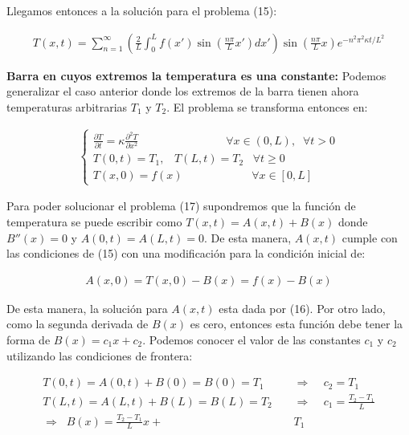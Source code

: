 \documentclass[12pt]{article}
\begin{document}
Llegamos entonces a la solución para el problema (15):

\begin{align}
    T(x,t) = \sum_{n=1}^{\infty} \left(\frac{2}{L}\int_0^L f(x')\sin \left(\frac{n\pi}{L}x'\right)dx'\right)\sin\left(\frac{n\pi}{L}x\right) e^{-n^2\pi^2\kappa t/L^2}
\end{align}

\textbf{Barra en cuyos extremos la temperatura es una constante: } Podemos generalizar el caso anterior donde los extremos de la barra tienen ahora temperaturas arbitrarias $T_1$ y $T_2$. El problema se transforma entonces en:

\begin{align}
    \begin{cases}
        \frac{\partial T}{\partial t} = \kappa \frac{\partial^2 T}{\partial x^2} \;\;\;\;\;\;\;\;\;\;\;\;\;\;\;\;\;\;\;\;\;\;\;\;\;\;\;\; \forall x\in (0,L), \;\; \forall t>0 \\
        T(0,t) = T_1, \;\;\; T(L,t) = T_2 \;\;\; \forall t \geq 0 \\
        T(x,0) = f(x) \;\;\;\;\;\;\;\;\;\;\;\;\;\;\;\;\;\;\;\;\;\; \forall x\in [0,L]
    \end{cases}
\end{align}

Para poder solucionar el problema (17) supondremos que la función de temperatura se puede escribir como $T(x,t) = A(x,t)+B(x)$ donde $B''(x) = 0$ y $A(0,t) = A(L,t) = 0$. De esta manera, $A(x,t)$ cumple con las condiciones de (15) con una modificación para la condición inicial de:

\begin{align*}
    A(x,0) = T(x,0)-B(x) = f(x) - B(x)
\end{align*}

De esta manera, la solución para $A(x,t)$ esta dada por (16). Por otro lado, como la segunda derivada de $B(x)$ es cero, entonces esta función debe tener la forma de $B(x) = c_1x + c_2$. Podemos conocer el valor de las constantes $c_1$ y $c_2$ utilizando las condiciones de frontera:

\begin{align*}
    T(0,t) = A(0,t)+B(0) = B(0) = T_1 \;\;\;\; &\Rightarrow \;\;\;\; c_2 = T_1 \\
    T(L,t) = A(L,t)+B(L) = B(L) = T_2 \;\;\;\; &\Rightarrow \;\;\;\; c_1 = \frac{T_2-T_1}{L} \\
    \Rightarrow \;\; B(x) = \frac{T_2-T_1}{L}x + &T_1
\end{align*}
\end{document}
